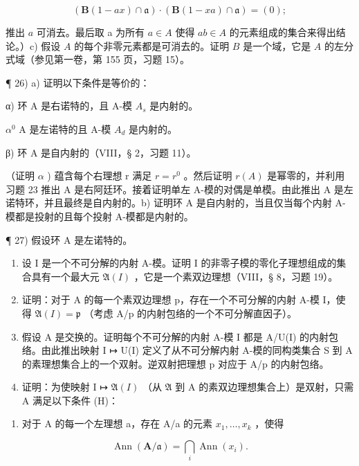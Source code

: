 \[
(\mathbf {B} (1 - a x) \cap \mathfrak {a}) \cdot (\mathbf {B} (1 - x a) \cap \mathfrak {a}) = (0);
\]

推出 \(a\) 可消去。最后取 a 为所有 \(a \in A\) 使得 \(ab \in A\) 的元素组成的集合来得出结论。）c) 假设 \(A\) 的每个非零元素都是可消去的。证明 \(B\) 是一个域，它是 \(A\) 的左分式域（参见第一卷，第 155 页，习题 15）。

¶ 26) a) 证明以下条件是等价的：

α) 环 A 是右诺特的，且 A-模 \(A_{s}\) 是内射的。

\(\alpha^{0}\) A 是左诺特的且 A-模 \(A_{d}\) 是内射的。

β) 环 A 是自内射的（VIII，§ 2，习题 11）。

（证明 \(\alpha\) ) 蕴含每个右理想 r 满足 \(r = r^0\) 。然后证明 \(r(A)\) 是幂零的，并利用习题 23 推出 A 是右阿廷环。接着证明单左 A-模的对偶是单模。由此推出 A 是左诺特环，并且最终是自内射的。b) 证明环 A 是自内射的，当且仅当每个内射 A-模都是投射的且每个投射 A-模都是内射的。

¶ 27) 假设环 A 是左诺特的。

\begin{enumerate}
\def\labelenumi{\alph{enumi})}
\item
  设 I 是一个不可分解的内射 A-模。证明 I 的非零子模的零化子理想组成的集合具有一个最大元 \(\mathfrak{A}(I)\) ，它是一个素双边理想（VIII，§ 8，习题 19）。
\item
  证明：对于 A 的每一个素双边理想 p，存在一个不可分解的内射 A-模 I，使得 \(\mathfrak{A}(I) = \mathfrak{p}\) （考虑 A/p 的内射包络的一个不可分解直因子）。
\item
  假设 A 是交换的。证明每个不可分解的内射 A-模 I 都是 A/U(I) 的内射包络。由此推出映射 I ↦ U(I) 定义了从不可分解内射 A-模的同构类集合 S 到 A 的素理想集合上的一个双射。逆双射把理想 p 对应于 A/p 的内射包络。
\item
  证明：为使映射 I ↦ \(\mathfrak{A}(I)\) （从 \(\mathfrak{A}\) 到 A 的素双边理想集合上）是双射，只需 A 满足以下条件 (H)：
\end{enumerate}

\begin{enumerate}
\def\labelenumi{(\Alph{enumi})}
\setcounter{enumi}{7}
\tightlist
\item
  对于 A 的每一个左理想 a，存在 A/a 的元素 \(x_{1}, \ldots, x_{k}\) ，使得
\end{enumerate}

\[
\operatorname{Ann} (\mathbf {A} / \mathfrak {a}) = \bigcap_ {i} \operatorname{Ann} (x _ {i}).
\]

